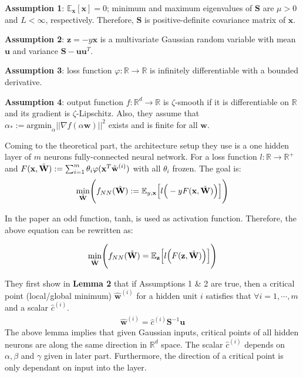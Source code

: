 \documentclass{article}
\begin{document}
\textbf{Assumption 1}: $\mathbb{E}_{\textbf{x}}[\textbf{x}]=0$; minimum and maximum eigenvalues of $\textbf{S}$ are $\mu>0$ and $L<\infty$, respectively. Therefore, $\textbf{S}$ is positive-definite covariance matrix of $\textbf{x}$.

\textbf{Assumption 2}: $\textbf{z}=-y\textbf{x}$ is a multivariate Gaussian random variable with mean $\textbf{u}$ and variance $\textbf{S}-\textbf{uu}^T$.

\textbf{Assumption 3}: loss function $\varphi:\mathbb{R}\rightarrow{}\mathbb{R}$ is infinitely differentiable with a bounded derivative.

\textbf{Assumption 4}: output function $f:\mathbb{R}^d\rightarrow{}\mathbb{R}$ is $\zeta$-smooth if it is differentiable on $\mathbb{R}$ and its gradient is $\zeta$-Lipschitz. Also, they assume that $\alpha_*:=\mathrm{argmin}_{\alpha}||\nabla f(\alpha\textbf{w})||^2$ exists and is finite for all $\textbf{w}$.

Coming to the theoretical part, the architecture setup they use is a one hidden layer of $m$ neurons fully-connected neural network. For a loss function $l:\mathbb{R}\rightarrow{}\mathbb{R}^+$ and $F(\textbf{x},\Tilde{\textbf{W}}):=\sum_{i=1}^m\theta_i\varphi(\textbf{x}^T\Tilde{\textbf{w}}^{(i)})$ with all $\theta_i$ frozen. The goal is:\\

\begin{align*}
\underset{\Tilde{\textbf{W}}}{\min}\Bigg(f_{NN}(\Tilde{\textbf{W}}):=\mathbb{E}_{y,\textbf{x}}\Big[l\Big(-yF(\textbf{x},\Tilde{\textbf{W}})\Big)\Big]\Bigg)
\end{align*}

In the paper an odd function, tanh, is used as activation function. Therefore, the above equation can be rewritten as:

\begin{align*}
\underset{\Tilde{\textbf{W}}}{\min}\Bigg(f_{NN}(\Tilde{\textbf{W}})=\mathbb{E}_{\textbf{z}}\Big[l\Big(F(\textbf{z},\Tilde{\textbf{W}})\Big)\Big]\Bigg)
\end{align*}

They first show in \textbf{Lemma 2} that if Assumptions 1 \& 2 are true, then a critical point (local/global minimum) $\hat{\textbf{w}}^{(i)}$ for a hidden unit $i$ satisfies that $\forall i=1,\cdots,m$ and a scalar $\hat{c}^{(i)}$.
\begin{align*}
\hat{\textbf{w}}^{(i)}=\hat{c}^{(i)}\textbf{S}^{-1}\textbf{u}
\end{align*}
The above lemma implies that given Gaussian inputs, critical points of all hidden neurons are along the same direction in $\mathbb{R}^d$ space. The scalar $\hat{c}^{(i)}$ depends on $\alpha, \beta$ and $\gamma$ given in later part. Furthermore, the direction of a critical point is only dependant on input into the layer. 
\end{document}
